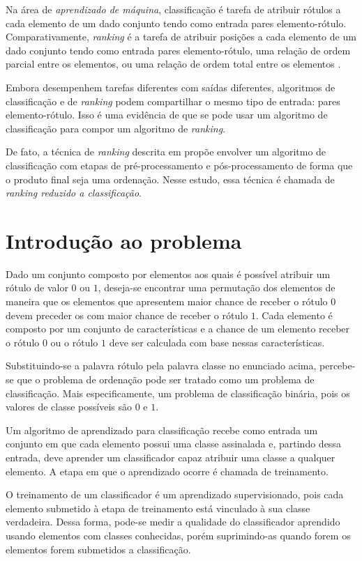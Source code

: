 Na área de \emph{aprendizado de máquina}, classificação é tarefa de atribuir rótulos a cada elemento de um dado conjunto tendo como entrada pares elemento-rótulo. Comparativamente, \emph{ranking} é a tarefa de atribuir posições a cada elemento de um dado conjunto tendo como entrada pares elemento-rótulo, uma relação de ordem parcial entre os elementos, ou uma relação de ordem total entre os elementos \cite{tieyan09}.

Embora desempenhem tarefas diferentes com saídas diferentes, algoritmos de classificação e de \emph{ranking} podem compartilhar o mesmo tipo de entrada: pares elemento-rótulo. Isso é uma evidência de que se pode usar um algoritmo de classificação para compor um algoritmo de \emph{ranking}.

De fato, a técnica de \emph{ranking} descrita em \cite{langford08} propõe envolver  um algoritmo de classificação com etapas de pré-processamento e pós-processamento de forma que o produto final seja uma ordenação. Nesse estudo, essa técnica é chamada de \emph{ranking reduzido a classificação}.

\section{Introdução ao problema}

Dado um conjunto composto por elementos aos quais é possível atribuir um rótulo de valor $0$ ou $1$, deseja-se encontrar uma permutação dos elementos de maneira que os elementos que apresentem maior chance de receber o rótulo $0$ devem preceder os com maior chance de receber o rótulo $1$. Cada elemento é composto por um conjunto de características e a chance de um elemento receber o rótulo $0$ ou o rótulo $1$ deve ser calculada com base nessas características.

Substituindo-se a palavra rótulo pela palavra classe no enunciado acima, percebe-se que o problema de ordenação pode ser tratado como um problema de classificação. Mais especificamente, um problema de classificação binária, pois os valores de classe possíveis são $0$ e $1$.

Um algoritmo de aprendizado para classificação recebe como entrada um conjunto em que cada elemento possui uma classe assinalada e, partindo dessa entrada, deve aprender um classificador capaz atribuir uma classe a qualquer elemento. A etapa em que o aprendizado ocorre é chamada de treinamento.

O treinamento de um classificador é um aprendizado supervisionado, pois cada elemento submetido à etapa de treinamento está vinculado à sua classe verdadeira. Dessa forma, pode-se medir a qualidade do classificador aprendido usando elementos com classes conhecidas, porém suprimindo-as quando forem os elementos forem submetidos a classificação.

